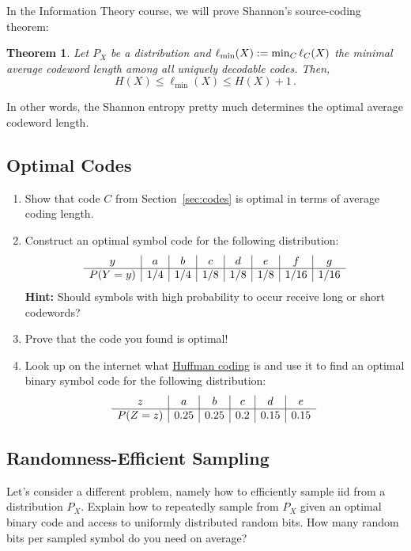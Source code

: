 \documentclass[11p,a4paper]{article}
\newtheorem{theorem}{Theorem}
\begin{document}
In the Information Theory course, we will prove Shannon's
source-coding theorem:
\begin{theorem}
Let $P_X$ be a distribution and $\ell_{\min}(X) := \min_C \ell_C(X)$
the minimal average codeword length among all uniquely decodable
codes. Then,
\[
H(X) \leq \ell_{\min}(X) \leq H(X)+1 \, .
\]
\end{theorem}
In other words, the Shannon entropy pretty much determines the optimal
average codeword length.

\subsection{Optimal Codes}
\begin{enumerate}
\item Show that code $C$ from Section~\ref{sec:codes} is optimal in
  terms of average coding length.
\item Construct an optimal symbol code for the following
  distribution:
\[
\begin{array}{c | c | c | c | c | c | c | c}
y & a & b & c & d & e & f & g\\
\hline
P(Y=y) & 1/4 & 1/4   & 1/8   & 1/8 & 1/8 & 1/16 & 1/16 \\
\end{array}
\]
{\bf Hint:} Should symbols with high probability to occur receive long or short codewords?
\item Prove that the code you found is optimal!
\item Look up on the internet what
  \href{https://en.wikipedia.org/wiki/Huffman_coding}{Huffman coding}
  is and use it to find an optimal binary symbol code for the following distribution:
\[
\begin{array}{c | c | c | c | c | c}
z & a & b & c & d & e\\
\hline
P(Z=z) & 0.25 & 0.25   & 0.2   & 0.15 & 0.15 \\
\end{array}
\]
\end{enumerate}

\subsection{Randomness-Efficient Sampling}
Let's consider a different problem, namely how to efficiently sample iid from a
distribution $P_X$. Explain how to repeatedly sample from $P_X$ given an optimal binary code
and access to uniformly distributed random bits. How many random bits
per sampled symbol do you need on average?
\end{document}
